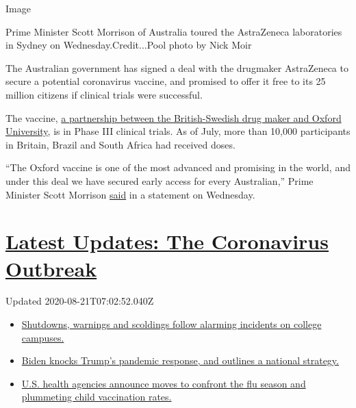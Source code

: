 Image

Prime Minister Scott Morrison of Australia toured the AstraZeneca
laboratories in Sydney on Wednesday.Credit...Pool photo by Nick Moir

The Australian government has signed a deal with the drugmaker
AstraZeneca to secure a potential coronavirus vaccine, and promised to
offer it free to its 25 million citizens if clinical trials were
successful.

The vaccine,
\href{https://www.nytimes3xbfgragh.onion/2020/07/20/world/covid-coronavirus-vaccine.html}{a
partnership between the British-Swedish drug maker and Oxford
University}, is in Phase III clinical trials. As of July, more than
10,000 participants in Britain, Brazil and South Africa had received
doses.

``The Oxford vaccine is one of the most advanced and promising in the
world, and under this deal we have secured early access for every
Australian,'' Prime Minister Scott Morrison
\href{https://www.pm.gov.au/media/new-deal-secures-potential-covid-19-vaccine-every-australian}{said}
in a statement on Wednesday.

\hypertarget{latest-updates-the-coronavirus-outbreak}{%
\section{\texorpdfstring{\href{https://www.nytimes3xbfgragh.onion/2020/08/20/world/coronavirus-covid.html?action=click\&pgtype=Article\&state=default\&region=MAIN_CONTENT_1\&context=storylines_live_updates}{Latest
Updates: The Coronavirus
Outbreak}}{Latest Updates: The Coronavirus Outbreak}}\label{latest-updates-the-coronavirus-outbreak}}

Updated 2020-08-21T07:02:52.040Z

\begin{itemize}
\tightlist
\item
  \href{https://www.nytimes3xbfgragh.onion/2020/08/20/world/coronavirus-covid.html?action=click\&pgtype=Article\&state=default\&region=MAIN_CONTENT_1\&context=storylines_live_updates\#link-68774d88}{Shutdowns,
  warnings and scoldings follow alarming incidents on college campuses.}
\item
  \href{https://www.nytimes3xbfgragh.onion/2020/08/20/world/coronavirus-covid.html?action=click\&pgtype=Article\&state=default\&region=MAIN_CONTENT_1\&context=storylines_live_updates\#link-26b58724}{Biden
  knocks Trump's pandemic response, and outlines a national strategy.}
\item
  \href{https://www.nytimes3xbfgragh.onion/2020/08/20/world/coronavirus-covid.html?action=click\&pgtype=Article\&state=default\&region=MAIN_CONTENT_1\&context=storylines_live_updates\#link-4e542da3}{U.S.
  health agencies announce moves to confront the flu season and
  plummeting child vaccination rates.}
\end{itemize}

